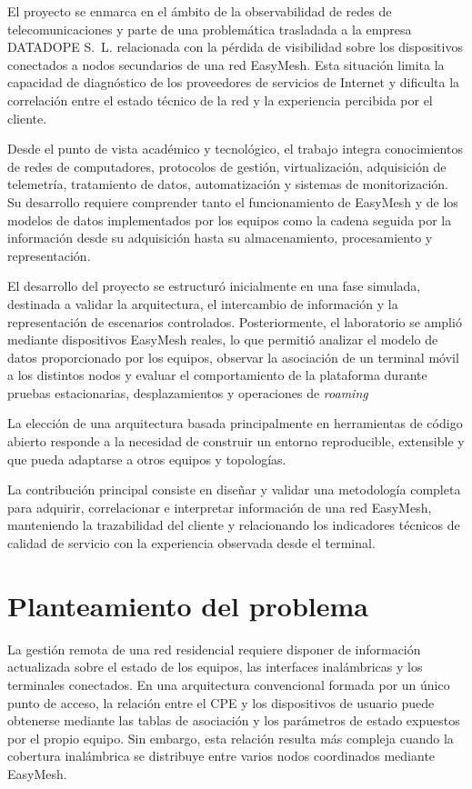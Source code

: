 El proyecto se enmarca en el ámbito de la observabilidad de redes de
telecomunicaciones y parte de una problemática trasladada a la empresa
DATADOPE S.~L. relacionada con la pérdida de visibilidad sobre los
dispositivos conectados a nodos secundarios de una red EasyMesh. Esta
situación limita la capacidad de diagnóstico de los proveedores de
servicios de Internet y dificulta la correlación entre el estado técnico
de la red y la experiencia percibida por el cliente.

Desde el punto de vista académico y tecnológico, el trabajo integra conocimientos de redes de computadores, 
protocolos de gestión, virtualización, adquisición de telemetría, tratamiento de datos, automatización y 
sistemas de monitorización. Su desarrollo requiere comprender tanto el funcionamiento de EasyMesh 
y de los modelos de datos implementados por los equipos como la cadena seguida por la información desde 
su adquisición hasta su almacenamiento, procesamiento y representación.

El desarrollo del proyecto se estructuró inicialmente en una fase simulada, 
destinada a validar la arquitectura, el intercambio de información 
y la representación de escenarios controlados. Posteriormente, 
el laboratorio se amplió mediante dispositivos EasyMesh reales, 
lo que permitió analizar el modelo de datos proporcionado por los equipos, 
observar la asociación de un terminal móvil a los distintos nodos y evaluar el comportamiento 
de la plataforma durante pruebas estacionarias, desplazamientos y operaciones de \textit{roaming}

La elección de una arquitectura basada principalmente en herramientas de código abierto 
responde a la necesidad de construir un entorno reproducible, extensible y que pueda adaptarse 
a otros equipos y topologías. 

La contribución principal consiste en diseñar y validar una metodología completa para adquirir, 
correlacionar e interpretar información de una red EasyMesh, manteniendo la trazabilidad del cliente 
y relacionando los indicadores técnicos de calidad de servicio con la experiencia observada desde el terminal.

\section{Planteamiento del problema}
\label{sec:planteamiento-problema}
La gestión remota de una red residencial requiere disponer de información actualizada 
sobre el estado de los equipos, las interfaces inalámbricas y los terminales conectados. 
En una arquitectura convencional formada por un único punto de acceso, la relación entre 
el CPE y los dispositivos de usuario puede obtenerse mediante las tablas de asociación y 
los parámetros de estado expuestos por el propio equipo. Sin embargo, esta relación resulta más compleja 
cuando la cobertura inalámbrica se distribuye entre varios nodos coordinados mediante EasyMesh.


